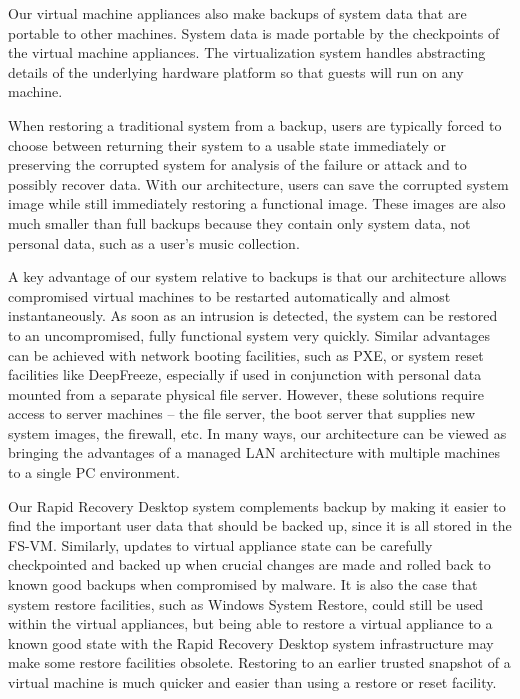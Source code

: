 Our virtual machine appliances also make backups of system data that are portable to other machines. System data is made portable by the checkpoints of the virtual machine appliances. The virtualization system handles abstracting details of the underlying hardware platform so that guests will run on any machine.
 
When restoring a traditional system from a backup, users are typically forced to choose between returning their system to a usable state immediately or preserving the corrupted system for analysis of the failure or attack and to possibly recover data. With our architecture, users can save the corrupted system image while still immediately restoring a functional image. These images are also much smaller than full backups because they contain only system data, not personal data, such as a user's music collection.
 
A key advantage of our system relative to backups is that our architecture allows compromised virtual machines to be restarted automatically and almost instantaneously. As soon as an intrusion is detected, the system can be restored to an uncompromised, fully functional system very quickly. Similar advantages can be achieved with network booting facilities, such as PXE, or system reset facilities like DeepFreeze\cite{deepfreeze_website}, especially if used in conjunction with personal data mounted from a separate physical file server. However, these solutions require access to server machines – the file server, the boot server that supplies new system images, the firewall, etc. In many ways, our architecture can be viewed as bringing the advantages of a managed LAN architecture with multiple machines to a single PC environment.

Our Rapid Recovery Desktop system complements backup by making it easier to find the important user data that should be backed up, since it is all stored in the FS-VM. Similarly, updates to virtual appliance state can be carefully checkpointed and backed up when crucial changes are made and rolled back to known good backups when compromised by malware. It is also the case that system restore facilities, such as Windows System Restore\cite{windows_system_restore}, could still be used within the virtual appliances, but being able to restore a virtual appliance to a known good state with the Rapid Recovery Desktop system infrastructure may make some restore facilities obsolete. Restoring to an earlier trusted snapshot of a virtual machine is much quicker and easier than using a restore or reset facility.

